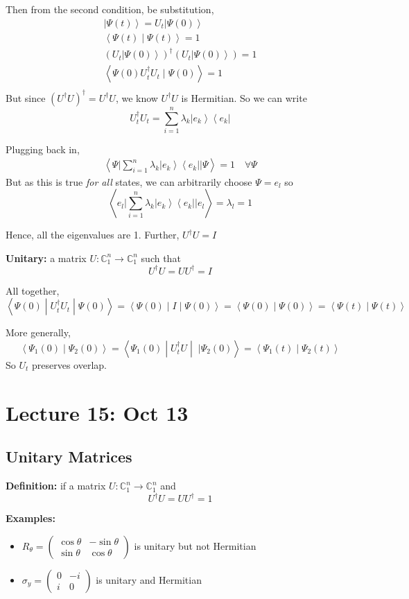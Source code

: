 \documentclass[12pt]{article}
\newcommand{\brak}[1]{\left\langle #1 \right\rangle}
\newcommand{\C}{\mathbb{C}}
\newcommand{\bra}[1]{\left\langle #1 \right\vert }
\newcommand{\ket}[1]{\left\vert #1 \right\rangle}
\begin{document}
Then from the second condition, be substitution,
\begin{gather*}
    \ket{\Psi(t)} = U_t\ket{\Psi(0)}\\ 
    \brak{\Psi(t) \; | \; \Psi(t)} = 1\\ 
    (U_t \ket{\Psi(0)})^\dagger (U_t \ket{\Psi(0)}) = 1\\
    \brak{\Psi(0) U_t^\dagger U_t \; | \; \Psi(0)} = 1\\
\end{gather*}
But since $(U^\dagger U)^\dagger = U^\dagger U$, we know $U^\dagger U$ is Hermitian. So we can write 
\[U_t^\dagger U_t = \sum_{i=1}^n \lambda_k \ket{e_k}\bra{e_k}\]

Plugging back in,
\begin{align*}
    \brak{\Psi \bigg\vert \sum_{i=1}^n \lambda_k \ket{e_k}\bra{e_k} \bigg\vert \Psi} = 1 \quad \forall \Psi
\end{align*}
But as this is true \emph{for all} states, we can arbitrarily choose $\Psi = e_l$ so 
\[\brak{e_l \bigg\vert \sum_{i=1}^n \lambda_k \ket{e_k}\bra{e_k} \bigg\vert e_l} = \lambda_l = 1\]

Hence, all the eigenvalues are 1. Further, $U^\dagger U = I$

\textbf{Unitary:} a matrix $U: \C_1^n \to \C_1^n$ such that 
\[U^\dagger U = UU^\dagger = I\]

All together, 
\[\brak{\Psi(0) \; | \; U_t^\dagger U_t \; | \; \Psi(0)} = \brak{\Psi(0) \; | \; I \; | \; \Psi(0)} = \brak{\Psi(0) \; | \; \Psi(0)} = \brak{\Psi(t) \; | \; \Psi(t)}\]

More generally, 
\[\brak{\Psi_1(0) \; | \; \Psi_2(0)} = \brak{\Psi_1(0) \; | \; U_t^\dagger U \; | \; \; | \Psi_2(0)} = \brak{\Psi_1(t) \; | \; \Psi_2(t)}\]
So $U_t$ preserves overlap. 

\section*{Lecture 15: Oct 13}
\subsection*{Unitary Matrices}
\textbf{Definition:} if a matrix $U: \C_1^n \to \C_1^n$ and 
\[U^\dagger U = UU^\dagger = 1\]

\textbf{Examples:}
\begin{itemize}
    \item $R_\theta = \begin{pmatrix}
        \cos \theta & -\sin \theta\\
        \sin \theta & \cos \theta
    \end{pmatrix}$ is unitary but not Hermitian

    \item $\sigma_y = \begin{pmatrix}
        0 & -i\\
        i & 0
    \end{pmatrix}$ is unitary and Hermitian 
\end{itemize}
\end{document}
